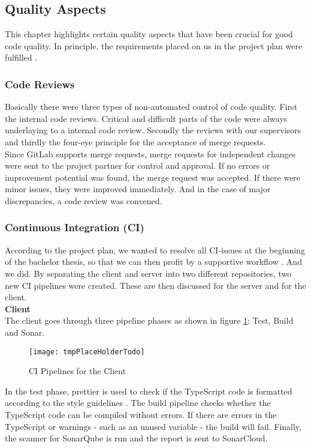 \subsection{Quality Aspects}
This chapter highlights certain quality aspects that have been crucial for good code quality.
In principle, the requirements placed on us in the project plan were fulfilled \cite{projectplan}.

\subsubsection{Code Reviews}
Basically there were three types of non-automated control of code quality.
First the internal code reviews. Critical and difficult parts of the code were always underlaying to a internal code review.
Secondly the reviews with our supervisors and
thirdly the four-eye principle for the acceptance of merge requests. \\

Since GitLab supports merge requests,
merge requests for independent changes were sent to the project partner for control and approval.
If no errors or improvement potential was found, the merge request was accepted.
If there were minor issues, they were improved immediately.
And in the case of major discrepancies, a code review was convened.

\subsubsection{Continuous Integration (CI)}
According to the project plan,
we wanted to resolve all CI-issues at the beginning of the bachelor thesis,
so that we can then profit by a supportive workflow \cite{projectplan}. And we did.
By separating the client and server into two different repositories, two new CI pipelines were created.
These are then discussed for the server and for the client. \\

{\bf Client}\\
The client goes through three pipeline phases as shown in figure \ref{fig:ci_client}: Test, Build and Sonar.

\begin{figure}[H]
    \centering
    \texttt{[image: tmpPlaceHolderTodo]}
    \caption{CI Pipelines for the Client}
    \label{fig:ci_client}
\end{figure}

In the test phase, prettier \cite{dev} is used to check if the TypeScript code
is formatted according to the style guidelines \cite{projectplan}.
The build pipeline checks whether the TypeScript code can be compiled without errors.
If there are errors in the TypeScript or warnings - such as an unused variable - the build will fail.
Finally, the scanner for SonarQube is run and the report is sent to SonarCloud. \\

